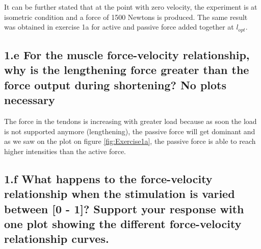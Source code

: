\documentclass{cmc}
\begin{document}
It can be further stated that at the point with zero velocity, the experiment is at isometric condition and a force of 1500 Newtons is produced. The same result was obtained in exercise 1a for active and passive force added together at $l_{opt}$.

\subsection*{1.e For the muscle force-velocity relationship, why is
  the lengthening force greater than the force output during
  shortening? No plots necessary}

The force in the tendons is increasing with greater load because as soon the load is not supported anymore (lengthening), the passive force will get dominant and as we saw on the plot on figure \ref{fig:Exercise1a}, the passive force is able to reach higher intensities than the active force.


\subsection*{1.f What happens to the force-velocity relationship
  when the stimulation is varied between [0 - 1]? Support your
  response with one plot showing the different force-velocity
  relationship curves.  }
\end{document}

